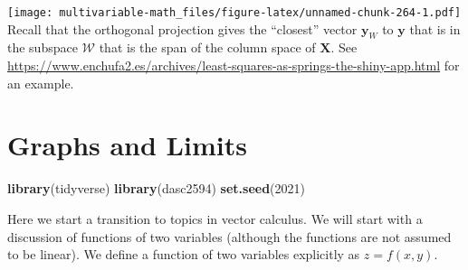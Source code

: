 \documentclass[
]{book}
\newenvironment{Shaded}{\begin{snugshade}}{\end{snugshade}}
\newcommand{\CommentTok}[1]{\textcolor[rgb]{0.56,0.35,0.01}{\textit{#1}}}
\newcommand{\DataTypeTok}[1]{\textcolor[rgb]{0.13,0.29,0.53}{#1}}
\newcommand{\DecValTok}[1]{\textcolor[rgb]{0.00,0.00,0.81}{#1}}
\newcommand{\KeywordTok}[1]{\textcolor[rgb]{0.13,0.29,0.53}{\textbf{#1}}}
\newcommand{\NormalTok}[1]{#1}
\newcommand{\OperatorTok}[1]{\textcolor[rgb]{0.81,0.36,0.00}{\textbf{#1}}}
\newcommand{\StringTok}[1]{\textcolor[rgb]{0.31,0.60,0.02}{#1}}
\theoremstyle{definition}
\theoremstyle{definition}
\theoremstyle{definition}
\theoremstyle{remark}
\begin{document}
\begin{Shaded}
\end{Shaded}

\texttt{[image: multivariable-math\_files/figure-latex/unnamed-chunk-264-1.pdf]}
Recall that the orthogonal projection gives the ``closest'' vector \(\mathbf{y}_W\) to \(\mathbf{y}\) that is in the subspace \(\mathcal{W}\) that is the span of the column space of \(\mathbf{X}\). See \url{https://www.enchufa2.es/archives/least-squares-as-springs-the-shiny-app.html} for an example.

\hypertarget{graphs-and-limits}{%
\chapter{Graphs and Limits}\label{graphs-and-limits}}

\begin{Shaded}
\begin{Highlighting}[]
\KeywordTok{library}\NormalTok{(tidyverse)}
\KeywordTok{library}\NormalTok{(dasc2594)}
\KeywordTok{set.seed}\NormalTok{(}\DecValTok{2021}\NormalTok{)}
\end{Highlighting}
\end{Shaded}

Here we start a transition to topics in vector calculus. We will start with a discussion of functions of two variables (although the functions are not assumed to be linear). We define a function of two variables explicitly as \(z = f(x, y)\).
\end{document}
